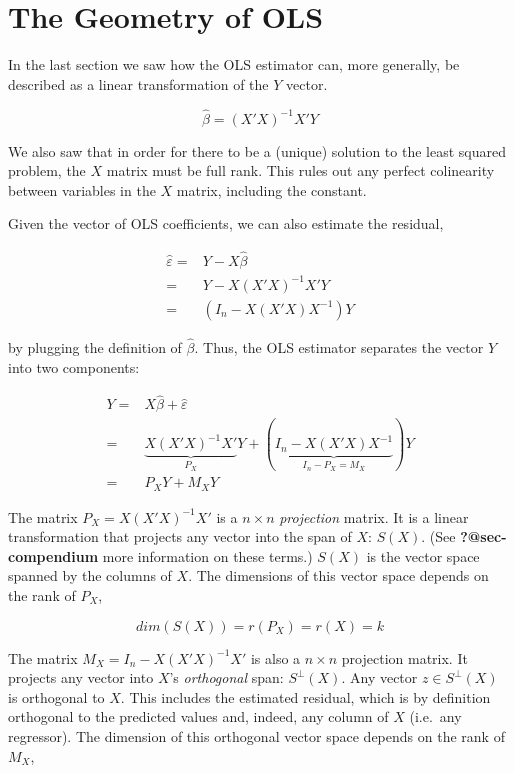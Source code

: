 \documentclass[
  letterpaper,
  DIV=11,
  numbers=noendperiod]{scrreprt}
\author{}
\date{}
\begin{document}
\ifdefined\Shaded\renewenvironment{Shaded}{\begin{tcolorbox}[enhanced, interior hidden, sharp corners, breakable, borderline west={3pt}{0pt}{shadecolor}, boxrule=0pt, frame hidden]}{\end{tcolorbox}}\fi

\hypertarget{sec-geometry}{%
\chapter{The Geometry of OLS}\label{sec-geometry}}

In the last section we saw how the OLS estimator can, more generally, be
described as a linear transformation of the \(Y\) vector.

\[
\hat{\beta} = (X'X)^{-1}X'Y
\]

We also saw that in order for there to be a (unique) solution to the
least squared problem, the \(X\) matrix must be full rank. This rules
out any perfect colinearity between variables in the \(X\) matrix,
including the constant.

Given the vector of OLS coefficients, we can also estimate the residual,

\[
\begin{align}
\hat{\varepsilon} =& Y - X\hat{\beta} \\
=&Y-X(X'X)^{-1}X'Y \\
=&(I_n-X(X'X)X^{-1})Y
\end{align}
\]

by plugging the definition of \(\hat{\beta}\). Thus, the OLS estimator
separates the vector \(Y\) into two components:

\[
\begin{align}
 Y =& X\hat{\beta} + \hat{\varepsilon}\\
=&\underbrace{X(X'X)^{-1}X'}_{P_X}Y + (\underbrace{I_n-X(X'X)X^{-1}}_{I_n-P_X = M_X})Y \\
=&P_XY + M_XY
\end{align}
\]

The matrix \(P_X = X(X'X)^{-1}X'\) is a \(n\times n\) \emph{projection}
matrix. It is a linear transformation that projects any vector into the
span of \(X\): \(S(X)\). (See \textbf{?@sec-compendium} more information
on these terms.) \(S(X)\) is the vector space spanned by the columns of
\(X\). The dimensions of this vector space depends on the rank of
\(P_X\),

\[
dim(S(X)) = r(P_X) = r(X) = k
\]

The matrix \(M_X = I_n-X(X'X)^{-1}X'\) is also a \(n\times n\)
projection matrix. It projects any vector into \(X\)'s \emph{orthogonal}
span: \(S^{\perp}(X)\). Any vector \(z\in S^{\perp}(X)\) is orthogonal
to \(X\). This includes the estimated residual, which is by definition
orthogonal to the predicted values and, indeed, any column of \(X\)
(i.e.~any regressor). The dimension of this orthogonal vector space
depends on the rank of \(M_X\),
\end{document}
